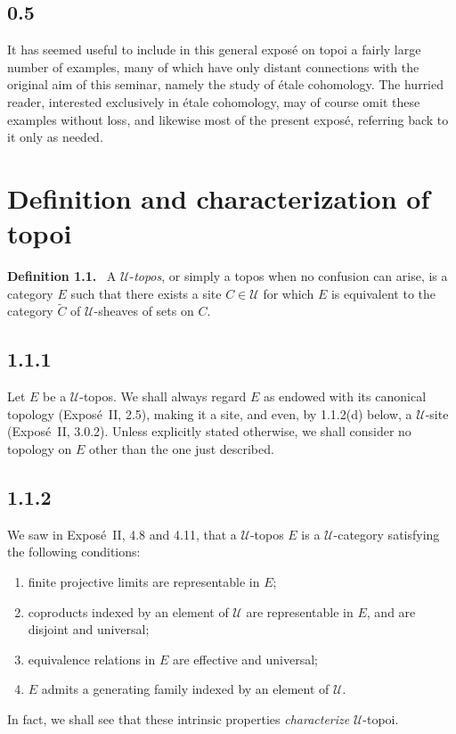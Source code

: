 \documentclass[11pt]{article}
\newcommand{\U}{\mathcal{U}}
\newenvironment{statement}[1]{\par\medskip\noindent\textbf{#1.}\ }{\par\medskip}
\begin{document}
\subsection*{0.5}
It has seemed useful to include in this general expos\'e on topoi a fairly large number of examples, many of which have only distant connections with the original aim of this seminar, namely the study of \'etale cohomology. The hurried reader, interested exclusively in \'etale cohomology, may of course omit these examples without loss, and likewise most of the present expos\'e, referring back to it only as needed.

\section{Definition and characterization of topoi}

\begin{statement}{Definition 1.1}
A \(\U\)-\emph{topos}, or simply a topos when no confusion can arise, is a category \(E\) such that there exists a site \(C\in\U\) for which \(E\) is equivalent to the category \(\widetilde C\) of \(\U\)-sheaves of sets on \(C\).
\end{statement}

\subsection*{1.1.1}
Let \(E\) be a \(\U\)-topos. We shall always regard \(E\) as endowed with its canonical topology (Expos\'e~II, 2.5), making it a site, and even, by 1.1.2(d) below, a \(\U\)-site (Expos\'e~II, 3.0.2). Unless explicitly stated otherwise, we shall consider no topology on \(E\) other than the one just described.

\subsection*{1.1.2}
We saw in Expos\'e~II, 4.8 and 4.11, that a \(\U\)-topos \(E\) is a \(\U\)-category satisfying the following conditions:
\begin{enumerate}[label=\alph*)]
\item finite projective limits are representable in \(E\);
\item coproducts indexed by an element of \(\U\) are representable in \(E\), and are disjoint and universal;
\item equivalence relations in \(E\) are effective and universal;
\item \(E\) admits a generating family indexed by an element of \(\U\).
\end{enumerate}
In fact, we shall see that these intrinsic properties \emph{characterize} \(\U\)-topoi.
\end{document}
